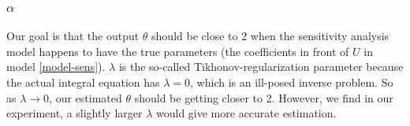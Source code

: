 \documentclass[11pt]{article}
\begin{document}






\subsubsection{$\alpha$}





Our goal is that the output $\theta$ should be close to 2 when the sensitivity analysis model happens to have the true parameters (the coefficients in front of $U$ in model \eqref{model-sens}). $\lambda$ is the so-called Tikhonov-regularization parameter because the actual integral equation has $\lambda = 0$, which is an ill-posed inverse problem. So as $\lambda \rightarrow 0$, our estimated $\theta$ should be getting closer to 2. However, we find in our experiment, a slightly larger $\lambda$ would give more accurate estimation.
\end{document}
